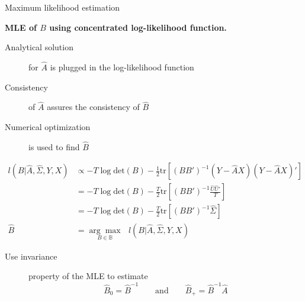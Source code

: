 \documentclass[notes,blackandwhite,mathsans,usenames,dvipsnames]{beamer}
\begin{document}
\begin{frame}{Maximum likelihood estimation}

\bigskip\textbf{MLE of $B$ using concentrated log-likelihood function.}

\bigskip
\begin{description}
\item[Analytical solution] {\color{mcxs2}for} $\widehat{A}$ {\color{mcxs2}is plugged in the log-likelihood function}
\item[Consistency] {\color{mcxs2}of} $\widehat{A}$ {\color{mcxs2}assures the consistency of} $\widehat{B}$
\item[Numerical optimization] {\color{mcxs2}is used to find} $\widehat{B}$
\end{description}
\small
\begin{align*}
l(B|\widehat{A},\widehat\Sigma,Y,X) &\propto -T\log\text{det}\left( B\right)  -\frac{1}{2}\text{tr}\left[ (BB')^{-1}(Y-\widehat{A}X)(Y-\widehat{A}X)' \right]\\
&= -T\log\text{det}\left( B\right)  -\frac{T}{2}\text{tr}\left[ (BB')^{-1}\frac{\widehat{U}\widehat{U}'}{T} \right]\\
&= -T\log\text{det}\left( B\right)  -\frac{T}{2}\text{tr}\left[ (BB')^{-1}\widehat\Sigma \right]\\[2ex]
\widehat{B} &= \underset{B\in\mathbb{B}}{\arg\max}\text{ } l(B|\widehat{A},\widehat\Sigma,Y,X)
\end{align*}
\normalsize
\begin{description}
\item[Use invariance] {\color{mcxs2}property of the MLE to estimate}
$$ \widehat{B}_0 = \widehat{B}^{-1}\qquad\text{and}\qquad \widehat{B}_+= \widehat{B}^{-1}\widehat{A}$$
\end{description}

\end{frame}
\end{document}
